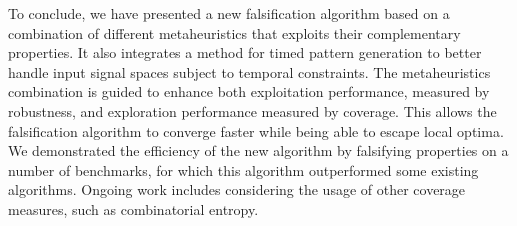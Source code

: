 
To conclude, we have presented a new falsification algorithm based on a combination of different metaheuristics that exploits their complementary properties. It also integrates a method for timed pattern generation to better handle input signal spaces subject to temporal constraints.
The metaheuristics combination is guided to enhance both exploitation performance, measured by robustness, and exploration performance measured by coverage. This allows the falsification algorithm to converge faster while being able to escape local optima. 
We demonstrated the efficiency of the new algorithm by falsifying
properties on a number of benchmarks, for which this algorithm outperformed some existing algorithms. Ongoing work includes considering the usage of other coverage measures, such as combinatorial entropy. 
